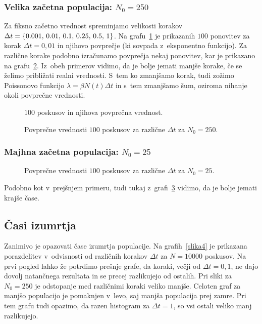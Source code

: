 \documentclass[a4paper,pdftex,11pt]{article}
\numberwithin{figure}{section} %
\begin{document}
\subsubsection*{Velika začetna populacija: $N_0=250$}
Za fiksno začetno vrednost spreminjamo velikosti korakov $\Delta t = \{ 0.001, \, 0.01, \\
\, 0.1, \, 0.25, \, 0.5, \, 1 \}$.
Na grafu~\ref{slika1} je prikazanih $100$ ponovitev za korak $\Delta t = 0,01$ in njihovo 
povprečje (ki sovpada z~eksponentno funkcijo). Za različne korake podobno izračunamo
povprečja nekaj ponovitev, kar je prikazano na grafu~\ref{slika2}. Iz~obeh primerov vidimo, 
da je bolje jemati manjše korake, če se želimo približati realni vrednosti.
S~tem ko zmanjšamo korak, tudi zožimo Poissonovo funkcijo $\lambda = \beta N(t) \Delta t$
in s~tem zmanjšamo šum, oziroma nihanje okoli povprečne vrednosti.
\begin{figure}[H]
    \centering
    \resizebox{0.65\linewidth}{!}{}
    \caption{$100$ poskusov in njihova povprečna vrednost.}
    \label{slika1}
\end{figure}

\begin{figure}[H] 
    \centering 
    \resizebox{0.46\textwidth}{!}{} 
    \resizebox{0.46\textwidth}{!}{} 
    \caption{Povprečne vrednosti $100$ poskusov za različne $\Delta t$ za $N_0=250$.}
    \label{slika2}
\end{figure}

\subsubsection*{Majhna začetna populacija: $N_0=25$}

\begin{figure}[H]  
    \centering 
    \resizebox{0.46\textwidth}{!}{} 
    \resizebox{0.46\textwidth}{!}{} 
    \caption{Povprečne vrednosti $100$ poskusov za različne $\Delta t$ za $N_0=25$.}
    \label{slika3}
\end{figure}
Podobno kot v~prejšnjem primeru, tudi tukaj z~grafi~\ref{slika3} vidimo, da je bolje 
jemati krajše čase. 

\subsection{Časi izumrtja}
Zanimivo je opazovati čase izumrtja populacije. Na grafih~\ref{slika4} je prikazana
porazdelitev v~odvisnosti od različnih korakov $\Delta t$ za $N=10000$ poskusov. Na prvi 
pogled lahko že potrdimo prešnje grafe, da koraki, večji od $\Delta t = 0,1$, ne dajo 
dovolj natančnega rezultata in se precej razlikujejo od ostalih. Pri sliki za $N_0=250$ je 
odstopanje med različnimi koraki veliko manjše. Celoten graf za manjšo populacijo je 
pomaknjen v~levo, saj manjša populacija prej zamre. Pri tem grafu tudi opazimo, da razen
histogram za $\Delta t =1$, so vsi ostali veliko manj razlikujejo.
\end{document}
